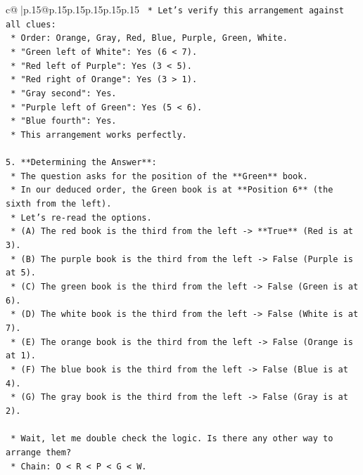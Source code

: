 \documentclass{article}
\begin{document}
{\begin{supertabular}{c@{$\;$}|p{.15\linewidth}@{}p{.15\linewidth}p{.15\linewidth}p{.15\linewidth}p{.15\linewidth}p{.15\linewidth}}
{{{\texttt{            *   Let's verify this arrangement against all clues:} \\
\texttt{                *   Order: Orange, Gray, Red, Blue, Purple, Green, White.} \\
\texttt{                *   "Green left of White": Yes (6 < 7).} \\
\texttt{                *   "Red left of Purple": Yes (3 < 5).} \\
\texttt{                *   "Red right of Orange": Yes (3 > 1).} \\
\texttt{                *   "Gray second": Yes.} \\
\texttt{                *   "Purple left of Green": Yes (5 < 6).} \\
\texttt{                *   "Blue fourth": Yes.} \\
\texttt{            *   This arrangement works perfectly.} \\
\\ 
\texttt{5.  **Determining the Answer**:} \\
\texttt{    *   The question asks for the position of the **Green** book.} \\
\texttt{    *   In our deduced order, the Green book is at **Position 6** (the sixth from the left).} \\
\texttt{    *   Let's re{-}read the options.} \\
\texttt{        *   (A) The red book is the third from the left {-}> **True** (Red is at 3).} \\
\texttt{        *   (B) The purple book is the third from the left {-}> False (Purple is at 5).} \\
\texttt{        *   (C) The green book is the third from the left {-}> False (Green is at 6).} \\
\texttt{        *   (D) The white book is the third from the left {-}> False (White is at 7).} \\
\texttt{        *   (E) The orange book is the third from the left {-}> False (Orange is at 1).} \\
\texttt{        *   (F) The blue book is the third from the left {-}> False (Blue is at 4).} \\
\texttt{        *   (G) The gray book is the third from the left {-}> False (Gray is at 2).} \\
\\ 
\texttt{    *   Wait, let me double check the logic. Is there any other way to arrange them?} \\
\texttt{        *   Chain: O < R < P < G < W.} \\
}}}
\end{supertabular}}
\end{document}
